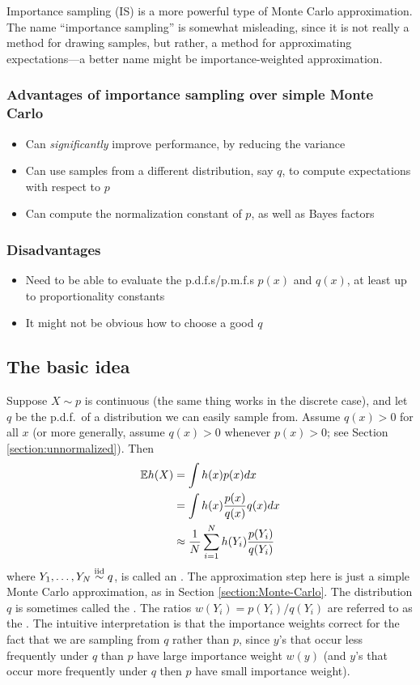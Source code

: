 \documentclass[12pt]{article}
\begin{document}
Importance sampling (IS) is a more powerful type of Monte Carlo approximation. The name ``importance sampling'' is somewhat misleading, since it is not really a method for drawing samples, but rather, a method for approximating expectations---a better name might be importance-weighted approximation. 

\subsubsection*{Advantages of importance sampling over simple Monte Carlo}
\begin{itemize}
\item Can \textit{significantly} improve performance, by reducing the variance
\item Can use samples from a different distribution, say $q$, to compute expectations with respect to $p$
\item Can compute the normalization constant of $p$, as well as Bayes factors
\end{itemize}
\subsubsection*{Disadvantages}
\begin{itemize}
\item Need to be able to evaluate the p.d.f.s/p.m.f.s $p(x)$ and $q(x)$, at least up to proportionality constants
\item It might not be obvious how to choose a good $q$
\end{itemize}

\subsection{The basic idea}
Suppose $X\sim p$ is continuous (the same thing works in the discrete case), and let $q$ be the p.d.f.\ of a distribution we can easily sample from. Assume $q(x)>0$ for all $x$ (or more generally, assume $q(x)>0$ whenever $p(x)>0$; see Section \ref{section:unnormalized}). Then
\begin{align*}
\mathbb{E} h(X) & = \int h(x) p(x) d x \\
& = \int h(x) \frac{p(x)}{q(x)} q(x) d x\\
& \approx \frac{1}{N}\sum_{i = 1}^N h(Y_i) \frac{p(Y_i)}{q(Y_i)}
\end{align*}
where $Y_1,\dotsc,Y_N\stackrel{\mathrm{iid}}{\sim} q$, is called an . The approximation step here is just a simple Monte Carlo approximation, as in Section \ref{section:Monte-Carlo}. The distribution $q$ is sometimes called the . The ratios $w(Y_i) = p(Y_i)/q(Y_i)$ are referred to as the . The intuitive interpretation is that the importance weights correct for the fact that we are sampling from $q$ rather than $p$, since $y$'s that occur less frequently under $q$ than $p$ have large importance weight $w(y)$ (and $y$'s that occur more frequently under $q$ then $p$ have small importance weight).  
\end{document}
